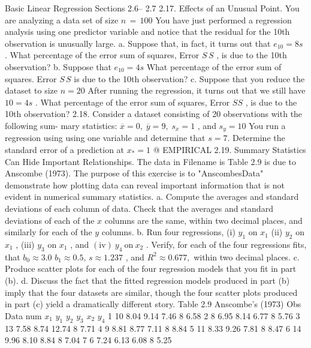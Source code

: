 \documentclass[11pt]{article}
\begin{document}
 Basic Linear Regression
Sections 2.6-- 2.7
 2.17. Effects of an Unusual Point. You are analyzing a data set of size \(n \,=\, 1 0 0\)
 You have just performed a regression analysis using one predictor variable
 and notice that the residual for the 10th observation is unusually large.
a. Suppose that, in fact, it turns out that \(e_{1 0}=8 s\) . What percentage of the
error sum of squares, Error \(S \, S\) , is due to the 10th observation?
b. Suppose that \(e_{1 0}=4 s\) What percentage of the error sum of squares.
Error \(S \, S\) is due to the 10th observation?
c. Suppose that you reduce the dataset to size \(n=2 0\) After running the
regression, it turns out that we still have \(1 0=4 s\) . What percentage of
the error sum of squares, Error \(\mathit{S S}\) , is due to the 10th observation?
2.18. Consider a dataset consisting of 20 observations with the following sum-
mary statistics: \(\overline{{x}}=0 , \; \overline{{y}}=9 , \; s_{x}=1\) , and \(s_{y}=1 0\) You run a regression
 using using one variable and determine that \(s=7 .\) Determine the standard
error of a prediction at \(x_{*}=1\)
@ EMPIRICAL 2.19. Summary Statistics Can Hide Important Relationships. The data in
Filename is Table 2.9 is due to Anscombe (1973). The purpose of this exercise is to
"AnscombesData" demonstrate how plotting data can reveal important information that is not
evident in numerical summary statistics.
 a. Compute the averages and standard deviations of each column of data.
Check that the averages and standard deviations of each of the \(x\)
columns are the same, within two decimal places, and similarly for
each of the \(y\) columns.
b. Run four regressions, (i) \(y_{1}\) on \(x_{1}\) (ii) \(y_{2}\) on \(x_{1}\) , (iii) \(y_{3}\) on \(x_{1}\) , and
\(( \mathrm{i v} ) ~ y_{4} ~ \mathrm{o n} ~ x_{2}\) . Verify, for each of the four regressions fits, that \(b_{0} \approx3 . 0\)
\(b_{1} \approx0 . 5 , \, s \approx1 . 2 3 7\) , and \(R^{2} \approx0 . 6 7 7 ,\) within two decimal places.
c. Produce scatter plots for each of the four regression models that you
fit in part (b).
d. Discuss the fact that the fitted regression models produced in part
(b) imply that the four datasets are similar, though the four scatter plots
 produced in part (c) yield a dramatically different story.
Table 2.9
Anscombe's (1973) Obs
Data num \(x_{1}\) \(y_{1}\) \(y_{2}\) \(y_{3}\) \(x_{2}\) \(y_{4}\)
1 10 8.04 9.14 7.46 8 6.58
2 8 6.95 8.14 6.77 8 5.76
3 13 7.58 8.74 12.74 8 7.71
4 9 8.81 8.77 7.11 8 8.84
5 11 8.33 9.26 7.81 8 8.47
6 14 9.96 8.10 8.84 8 7.04
7 6 7.24 6.13 6.08 8 5.25
\end{document}
